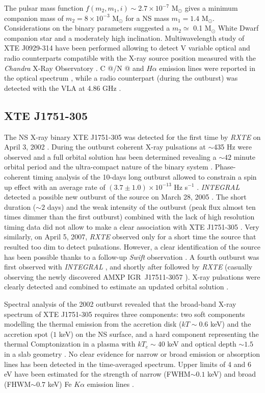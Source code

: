 \documentclass[graybox]{svmult}
\makeatletter
\def \inte {{\em INTEGRAL\xspace}}
\def \swift {{\em Swift\xspace}}
\def \chandra {{\em Chandra\xspace}}
\def \rxte {{\em RXTE\xspace}}
\newcommand*{\rom}[1]{\expandafter\@slowromancap\romannumeral #1@}
\makeatother
\begin{document}
The pulsar mass function $f(m_2,m_1,i)\sim 2.7\times 10^{-7}$ M$_\odot$ gives a minimum companion mass of $m_2=8\times10^{-3}$ M$_\odot$ for a NS mass $m_1=1.4$ M$_\odot$. Considerations on the binary parameters suggested a $m_2\simeq$ 0.1 M$_\odot$ White Dwarf companion star and a moderately high inclination. Multiwavelength study of XTE J0929-314 have been performed allowing to detect V variable optical \cite{Greenhill2002,Cacella2002} and radio \cite{Rupen2002} counterparts compatible with the X-ray source position measured with the \chandra{} X-Ray Observatory \cite{Juett2003}. C \rom{3}/N \rom{3} and $H\alpha$ emission lines were reported in the optical spectrum \cite{Castro2002}, while a radio counterpart (during the outburst) was detected with the VLA at 4.86 GHz \cite{Rupen2002}.

\subsection{XTE J1751-305}

The NS X-ray binary XTE J1751-305 was detected for the first time by \rxte{} on April 3, 2002 \cite{Markwardt2002a}. During the outburst coherent X-ray pulsations at $\sim$435 Hz were observed and a full orbital solution has been determined revealing a $\sim42$ minute orbital period and the ultra-compact nature of the binary system \cite{Markwardt2002}. Phase-coherent timing analysis of the 10-days long outburst allowed to constrain a spin up effect with an average rate of $(3.7\pm1.0)\times10^{-13}$ Hz s$^{-1}$ \cite{Papitto2008}. \inte{} detected a possible new outburst of the source on March 28, 2005 \cite{Grebenev2005}. The short duration ($\sim2$ days) and the weak intensity of the outburst (peak flux almost ten times dimmer than the first outburst) combined with the lack of high resolution timing data did not allow to make a clear association with XTE J1751-305 \cite{Swank2005}. Very similarly, on April 5, 2007, \rxte{} observed only for a short time the source that resulted too dim to detect pulsations. However, a clear identification of the source has been possible thanks to a follow-up \swift{} observation \cite{Markwardt2007}. A fourth outburst was first observed with \inte{} \cite{Chenevez2009}, and shortly after followed by \rxte{} (casually observing the newly discovered AMXP IGR~J17511-3057 \cite{Markwardt2009}). X-ray pulsations were clearly detected and combined to estimate an updated orbital solution \cite{Riggio2011}. 

Spectral analysis of the 2002 outburst revealed that the broad-band X-ray spectrum of XTE J1751-305 requires three components: two soft components modelling the thermal emission from the accretion disk ($kT\sim0.6$ keV) and the accretion spot ($1$ keV) on the NS surface, and a hard component representing the thermal Comptonization in a plasma with $kT_e\sim40$ keV and optical depth $\sim1.5$ in a slab geometry \cite{Gierlinski2005}. No clear evidence for narrow or broad emission or absorption lines has been detected in the time-averaged spectrum. Upper limits of 4 and 6 eV have been estimated for the strength of narrow (FWHM$\sim0.1$ keV) and broad (FHWM$\sim0.7$ keV) Fe $K\alpha$ emission lines \cite{Miller2003}. 
\end{document}
